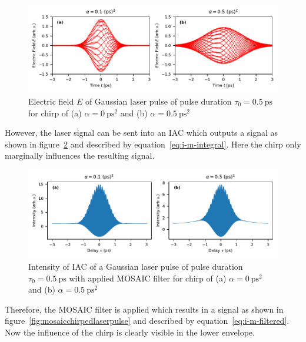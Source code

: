 \begin{figure}[H]
	\centering
	\includegraphics[width=\linewidth]{figures/chirp/plots/chirped_laser_pulse}
	\caption{Electric field $E$ of Gaussian laser pulse of pulse duration $\tau_0=\SI{0.5}{\pico \second}$ for chirp of (a) $\alpha = \SI{0}{\pico \second \squared}$ and (b) $\alpha = \SI{0.5}{\pico \second \squared}$}
	\label{fig:chirpedlaserpulse}
\end{figure}

However, the laser signal can be sent into an \ac{IAC} which outputs a signal as shown in figure~\ref{fig:imgausschirpwithoutslitwithoutmosaic} and described by equation~\eqref{eq:i-m-integral}.
Here the chirp only marginally influences the resulting signal.

\begin{figure}[H]
	\centering
	\includegraphics[width=\linewidth]{figures/chirp/plots/I_M_gauss_chirp_without_slit_without_MOSAIC}
	\caption{Intensity of IAC of a Gaussian laser pulse of pulse duration $\tau_0=\SI{0.5}{\pico \second}$ with applied MOSAIC filter for chirp of (a) $\alpha = \SI{0}{\pico \second \squared}$ and (b) $\alpha = \SI{0.5}{\pico \second \squared}$}
	\label{fig:imgausschirpwithoutslitwithoutmosaic}
\end{figure}

Therefore, the MOSAIC filter is applied which results in a signal as shown in figure~\ref{fig:mosaicchirpedlaserpulse} and described by equation~\eqref{eq:i-m-filtered}.
Now the influence of the chirp is clearly visible in the lower envelope.

